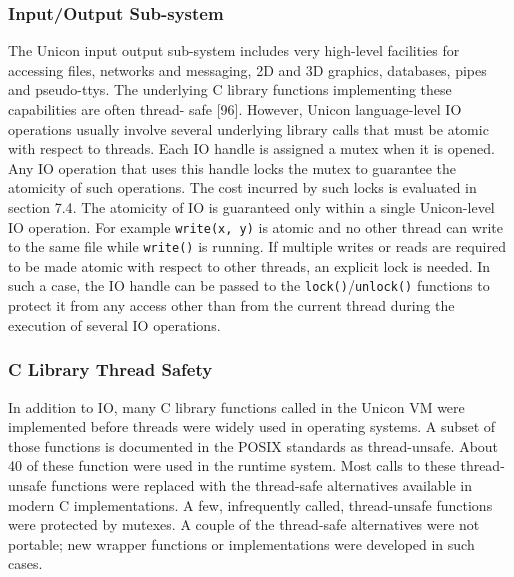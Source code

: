\subsubsection{Input/Output Sub-system}
The Unicon input output sub-system includes very high-level facilities for
accessing files, networks and messaging, 2D and 3D graphics, databases,
pipes and pseudo-ttys. The underlying C library functions implementing
these capabilities are often thread- safe [96]. However, Unicon
language-level IO operations usually involve several underlying library
calls that must be atomic with respect to threads. Each IO handle is
assigned a mutex when it is opened.  Any IO operation that uses this handle
locks the mutex to guarantee the atomicity of such operations. The cost
incurred by such locks is evaluated in {\color{red} section 7.4}.  The
atomicity of IO is guaranteed only within a single Unicon-level IO
operation. For example \texttt{write(x, y)} is atomic and no other thread
can write to the same file while \texttt{write()} is running.  If multiple
writes or reads are required to be made atomic with respect to other
threads, an explicit lock is needed. In such a case, the IO handle can be
passed to the \texttt{lock()}/\texttt{unlock()} functions to protect it
from any access other than from the current thread during the execution of
several IO operations.

\subsubsection{C Library Thread Safety}
In addition to IO, many C library functions called in the Unicon VM were
implemented before threads were widely used in operating systems. A subset
of those functions is documented in the POSIX standards as
thread-unsafe. About 40 of these function were used in the runtime system.
Most calls to these thread-unsafe functions were replaced with the
thread-safe alternatives available in modern C implementations. A few,
infrequently called, thread-unsafe functions were protected by mutexes. A
couple of the thread-safe alternatives were not portable; new wrapper
functions or implementations were developed in such cases.

